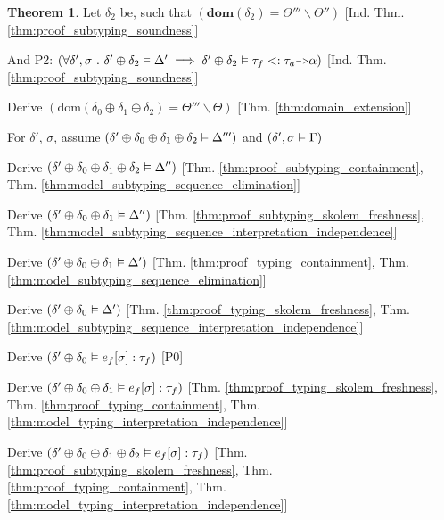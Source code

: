\documentclass[acmsmall]{acmart}
\theoremstyle{definition}
\newtheorem{theorem}{Theorem}[section]
\begin{document}
\begin{theorem}
  \item \I \N Let $\delta_2$ be, such that $(
    \textbf{dom}(\delta_2) = \Theta''' \backslash \Theta''
  )$ [Ind. Thm. \ref{thm:proof_subtyping_soundness}]
  \item \I \N And P2: $(
    \forall \delta', \sigma \qua 
    \delta' \oplus \delta_2 \satisfies \Delta' \implies
    \delta' \oplus \delta_2 \satisfies \tau_f \subtypes \tau_a \J{->} \alpha
  )$ [Ind. Thm. \ref{thm:proof_subtyping_soundness}]

  \item \I \N Derive $(
    \text{dom}(\delta_0 \oplus \delta_1 \oplus \delta_2) = \Theta''' \backslash \Theta
  )$ [Thm. \ref{thm:domain_extension}]


  \item \I \N For $\delta'$, $\sigma$,
    assume $(\delta' \oplus \delta_0 \oplus \delta_1 \oplus \delta_2 \vDash \Delta''')$
    and $(\delta', \sigma \vDash \Gamma)$

  \item \I\I \N Derive $(
    \delta' \oplus \delta_0 \oplus \delta_1 \oplus \delta_2 \vDash \Delta''
  )$ [Thm. \ref{thm:proof_subtyping_containment}, Thm. \ref{thm:model_subtyping_sequence_elimination}]

  \item \I\I \N Derive $(
    \delta' \oplus \delta_0 \oplus \delta_1 \vDash \Delta''
  )$ [Thm. \ref{thm:proof_subtyping_skolem_freshness}, Thm. \ref{thm:model_subtyping_sequence_interpretation_independence}]

  \item \I\I \N Derive $(
    \delta' \oplus \delta_0 \oplus \delta_1 \vDash \Delta'
  )$ [Thm. \ref{thm:proof_typing_containment}, Thm. \ref{thm:model_subtyping_sequence_elimination}]

  \item \I\I \N Derive $(
    \delta' \oplus \delta_0 \vDash \Delta'
  )$ [Thm. \ref{thm:proof_typing_skolem_freshness}, Thm. \ref{thm:model_subtyping_sequence_interpretation_independence}]

  \item \I\I \N Derive $(
    \delta' \oplus \delta_0 \vDash e_f[\sigma] : \tau_f
  )$ [P0]
  \item \I\I \N Derive $(
    \delta' \oplus \delta_0 \oplus \delta_1 \vDash e_f[\sigma] : \tau_f
  )$ [Thm. \ref{thm:proof_typing_skolem_freshness}, 
      Thm. \ref{thm:proof_typing_containment},
      Thm. \ref{thm:model_typing_interpretation_independence}]
  \item \I\I \N Derive $(
    \delta' \oplus \delta_0 \oplus \delta_1 \oplus \delta_2 \vDash e_f[\sigma] : \tau_f
  )$ [Thm. \ref{thm:proof_subtyping_skolem_freshness}, 
      Thm. \ref{thm:proof_typing_containment},
      Thm. \ref{thm:model_typing_interpretation_independence}]


\end{theorem}
\end{document}
